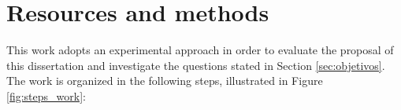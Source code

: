  
 

\section{Resources and methods} 


This work adopts an experimental approach in order to evaluate the proposal of this dissertation and investigate the questions stated in Section \ref{sec:objetivos}. 
The work is organized in the following steps, illustrated in Figure \ref{fig:steps_work}:

